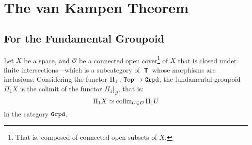 \section{The van Kampen Theorem}

\subsection{For the Fundamental Groupoid}

\begin{theorem}
    \label{thm:van-Kampen-groupoid}
    Let \(X\) be a space, and \(\mathcal{O}\) be a connected open
    cover\footnote{That is, composed of connected open subsets of \(X\).} of \(X\)
    that is closed under finite intersections---which is a subcategory of \(\Top\)
    whose morphisms are inclusions. Considering the functor
    \(\Pi_1: {\texttt{Top}} \to {\texttt{Grpd}}\), the fundamental groupoid \(\Pi_1 X\) is the colimit
    of the functor \(\Pi_1|_{\mathcal{O}}\), that is:
    \[
        \Pi_1 X \simeq \operatorname{colim}_{U \in \mathcal{O}} \Pi_1 U
    \]
    in the category \({\texttt{Grpd}}\).
\end{theorem}

